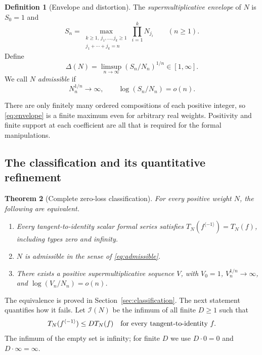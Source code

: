 \documentclass[11pt,a4paper]{article}
\numberwithin{equation}{section}
\newtheorem{theorem}{Theorem}[section]
\theoremstyle{definition}
\newtheorem{definition}[theorem]{Definition}
\theoremstyle{remark}
\newcommand{\Type}{T_N}
\newcommand{\inv}[1]{#1^{\langle-1\rangle}}
\begin{document}
\begin{definition}[Envelope and distortion]
The \emph{supermultiplicative envelope} of $N$ is $S_0=1$ and
\begin{equation}
 S_n=\max_{\substack{k\ge1,\ j_1,\ldots,j_k\ge1\\
                         j_1+\cdots+j_k=n}}
             \prod_{i=1}^{k}N_{j_i}\qquad(n\ge1).
 \label{eq:envelope}
\end{equation}
Define
\begin{equation}
 \Delta(N)=\limsup_{n\to\infty}(S_n/N_n)^{1/n}\in[1,\infty].
 \label{eq:delta}
\end{equation}
We call $N$ \emph{admissible} if
\begin{equation}
 N_n^{1/n}\longrightarrow\infty,
 \qquad \log(S_n/N_n)=o(n).
 \label{eq:admissible}
\end{equation}
\end{definition}

There are only finitely many ordered compositions of each positive
integer, so \eqref{eq:envelope} is a finite maximum even for arbitrary
real weights. Positivity and finite support at each coefficient are all
that is required for the formal manipulations.

\subsection{The classification and its quantitative refinement}

\begin{theorem}[Complete zero-loss classification]
\label{thm:classificationintro}
For every positive weight $N$, the following are equivalent.
\begin{enumerate}[label=\textup{(\roman*)}]
\item Every tangent-to-identity scalar formal series satisfies
$\Type(\inv f)=\Type(f)$, including types zero and infinity.
\item $N$ is admissible in the sense of \eqref{eq:admissible}.
\item There exists a positive supermultiplicative sequence $V$, with
$V_0=1$, $V_n^{1/n}\to\infty$, and
$\log(V_n/N_n)=o(n)$.
\end{enumerate}
\end{theorem}

The equivalence is proved in Section~\ref{sec:classification}. The next
statement quantifies how it fails. Let $\mathcal I(N)$ be the infimum of
all finite $D\ge1$ such that
\begin{equation}
 \Type(\inv f)\le D\Type(f)
 \quad\hbox{for every tangent-to-identity } f.
 \label{eq:universalD}
\end{equation}
The infimum of the empty set is infinity; for finite $D$ we use
$D\cdot0=0$ and $D\cdot\infty=\infty$.
\end{document}
